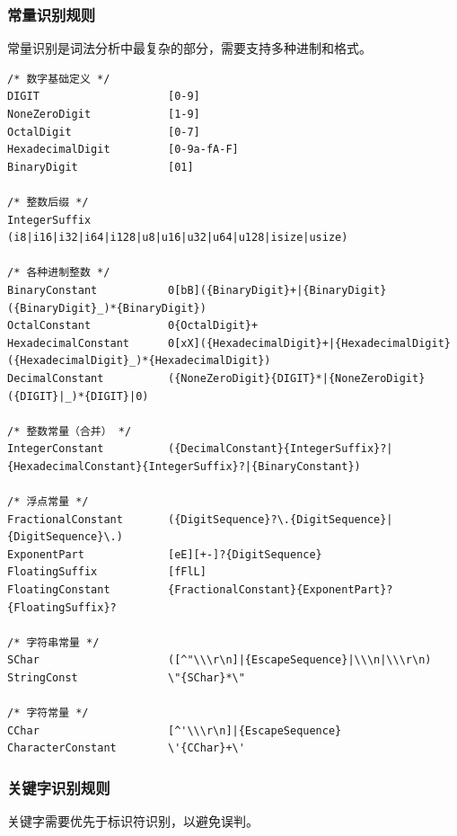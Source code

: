 \documentclass[12pt,a4paper]{ctexart}
\begin{document}
\subsubsection{常量识别规则}

常量识别是词法分析中最复杂的部分，需要支持多种进制和格式。

\begin{lstlisting}[language=Flex, basicstyle=\ttfamily\scriptsize, caption={常量正则表达式规则}]
/* 数字基础定义 */
DIGIT                    [0-9]
NoneZeroDigit            [1-9]
OctalDigit               [0-7]
HexadecimalDigit         [0-9a-fA-F]
BinaryDigit              [01]

/* 整数后缀 */
IntegerSuffix            (i8|i16|i32|i64|i128|u8|u16|u32|u64|u128|isize|usize)

/* 各种进制整数 */
BinaryConstant           0[bB]({BinaryDigit}+|{BinaryDigit}({BinaryDigit}_)*{BinaryDigit})
OctalConstant            0{OctalDigit}+
HexadecimalConstant      0[xX]({HexadecimalDigit}+|{HexadecimalDigit}({HexadecimalDigit}_)*{HexadecimalDigit})
DecimalConstant          ({NoneZeroDigit}{DIGIT}*|{NoneZeroDigit}({DIGIT}|_)*{DIGIT}|0)

/* 整数常量（合并） */
IntegerConstant          ({DecimalConstant}{IntegerSuffix}?|{HexadecimalConstant}{IntegerSuffix}?|{BinaryConstant})

/* 浮点常量 */
FractionalConstant       ({DigitSequence}?\.{DigitSequence}|{DigitSequence}\.)
ExponentPart             [eE][+-]?{DigitSequence}
FloatingSuffix           [fFlL]
FloatingConstant         {FractionalConstant}{ExponentPart}?{FloatingSuffix}?

/* 字符串常量 */
SChar                    ([^"\\\r\n]|{EscapeSequence}|\\\n|\\\r\n)
StringConst              \"{SChar}*\"

/* 字符常量 */
CChar                    [^'\\\r\n]|{EscapeSequence}
CharacterConstant        \'{CChar}+\'
\end{lstlisting}

\subsubsection{关键字识别规则}

关键字需要优先于标识符识别，以避免误判。
\end{document}
